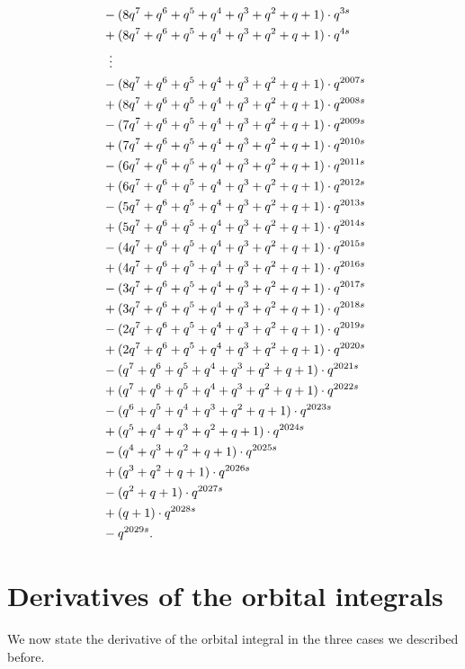 \begin{example}
\begin{align*}
    &- (8q^7+q^6+q^5+q^4+q^3+q^2+q+1) \cdot q^{3s} \\
    &+ (8q^7+q^6+q^5+q^4+q^3+q^2+q+1) \cdot q^{4s} \\
    &\vdotswithin= \\
    &- (8q^7+q^6+q^5+q^4+q^3+q^2+q+1) \cdot q^{2007s} \\
    &+ (8q^7+q^6+q^5+q^4+q^3+q^2+q+1) \cdot q^{2008s} \\
    &- (7q^7+q^6+q^5+q^4+q^3+q^2+q+1) \cdot q^{2009s} \\
    &+ (7q^7+q^6+q^5+q^4+q^3+q^2+q+1) \cdot q^{2010s} \\
    &- (6q^7+q^6+q^5+q^4+q^3+q^2+q+1) \cdot q^{2011s} \\
    &+ (6q^7+q^6+q^5+q^4+q^3+q^2+q+1) \cdot q^{2012s} \\
    &- (5q^7+q^6+q^5+q^4+q^3+q^2+q+1) \cdot q^{2013s} \\
    &+ (5q^7+q^6+q^5+q^4+q^3+q^2+q+1) \cdot q^{2014s} \\
    &- (4q^7+q^6+q^5+q^4+q^3+q^2+q+1) \cdot q^{2015s} \\
    &+ (4q^7+q^6+q^5+q^4+q^3+q^2+q+1) \cdot q^{2016s} \\
    &- (3q^7+q^6+q^5+q^4+q^3+q^2+q+1) \cdot q^{2017s} \\
    &+ (3q^7+q^6+q^5+q^4+q^3+q^2+q+1) \cdot q^{2018s} \\
    &- (2q^7+q^6+q^5+q^4+q^3+q^2+q+1) \cdot q^{2019s} \\
    &+ (2q^7+q^6+q^5+q^4+q^3+q^2+q+1) \cdot q^{2020s} \\
    &- (q^7+q^6+q^5+q^4+q^3+q^2+q+1) \cdot q^{2021s} \\
    &+ (q^7+q^6+q^5+q^4+q^3+q^2+q+1) \cdot q^{2022s} \\
    &- (q^6+q^5+q^4+q^3+q^2+q+1) \cdot q^{2023s} \\
    &+ (q^5+q^4+q^3+q^2+q+1) \cdot q^{2024s} \\
    &- (q^4+q^3+q^2+q+1) \cdot q^{2025s} \\
    &+ (q^3+q^2+q+1) \cdot q^{2026s} \\
    &- (q^2+q+1) \cdot q^{2027s} \\
    &+ (q+1) \cdot q^{2028s} \\
    &- q^{2029s}.
  \end{align*}
\end{example}

\section{Derivatives of the orbital integrals}
We now state the derivative of the orbital integral in the three cases we described before.


